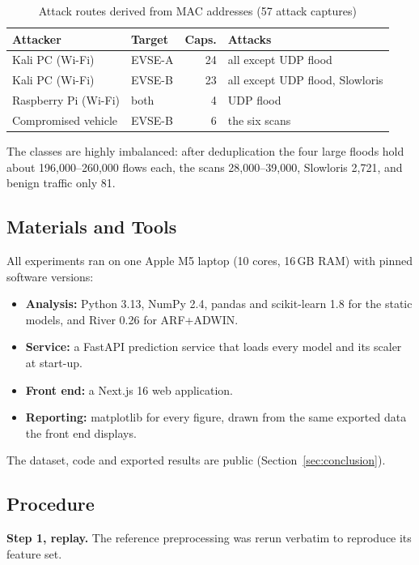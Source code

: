 \documentclass[conference]{IEEEtran}
\begin{document}
\begin{table}[!t]
\caption{Attack routes derived from MAC addresses (57 attack captures)}
\label{tab:routes}
\centering
\footnotesize
\begin{tabularx}{\columnwidth}{@{}llrL@{}}
\toprule
\textbf{Attacker} & \textbf{Target} & \textbf{Caps.} & \textbf{Attacks} \\
\midrule
Kali PC (Wi-Fi)       & EVSE-A & 24 & all except UDP flood \\
Kali PC (Wi-Fi)       & EVSE-B & 23 & all except UDP flood, Slowloris \\
Raspberry Pi (Wi-Fi)  & both   & 4  & UDP flood \\
Compromised vehicle   & EVSE-B & 6  & the six scans \\
\bottomrule
\end{tabularx}
\end{table}

The classes are highly imbalanced: after deduplication the four large floods hold about 196,000--260,000 flows each, the scans 28,000--39,000, Slowloris 2,721, and benign traffic only 81.

\subsection{Materials and Tools}

All experiments ran on one Apple M5 laptop (10 cores, 16\,GB RAM) with pinned software versions:
\begin{itemize}
    \item \textbf{Analysis:} Python 3.13, NumPy 2.4, pandas and scikit-learn 1.8 \cite{b12} for the static models, and River 0.26 \cite{b9} for ARF+ADWIN.
    \item \textbf{Service:} a FastAPI prediction service that loads every model and its scaler at start-up.
    \item \textbf{Front end:} a Next.js 16 web application.
    \item \textbf{Reporting:} matplotlib for every figure, drawn from the same exported data the front end displays.
\end{itemize}
The dataset, code and exported results are public (Section~\ref{sec:conclusion}).

\subsection{Procedure}

\textbf{Step 1, replay.} The reference preprocessing \cite{b4} was rerun verbatim to reproduce its feature set.
\end{document}
